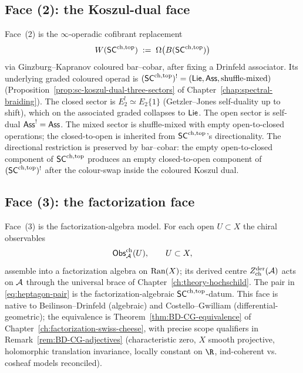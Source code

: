 \subsection{Face (2): the Koszul-dual face}\label{subsec:face-koszul-dual}

Face~(2) is the $\infty$-operadic cofibrant replacement
\begin{equation}
 W(\mathsf{SC}^{\mathrm{ch},\mathrm{top}})
 \;:=\;
 \Omega\bigl(B(\mathsf{SC}^{\mathrm{ch},\mathrm{top}})\bigr)
\end{equation}
via Ginzburg--Kapranov coloured bar--cobar, after fixing a Drinfeld
associator. Its underlying graded coloured operad is
$(\mathsf{SC}^{\mathrm{ch},\mathrm{top}})^{!}=(\mathsf{Lie},\mathsf{Ass},\text{shuffle-mixed})$
(Proposition~\ref{prop:sc-koszul-dual-three-sectors} of
Chapter~\ref{chap:spectral-braiding}).
The closed sector is
$E_2^{!}\simeq E_2\{1\}$ (Getzler--Jones self-duality up to shift),
which on the associated graded collapses to $\mathsf{Lie}$.
The open sector is self-dual $\mathsf{Ass}^{!}=\mathsf{Ass}$. The mixed sector is
shuffle-mixed with empty open-to-closed operations; the
closed-to-open is inherited from $\mathsf{SC}^{\mathrm{ch},\mathrm{top}}$'s directionality.
The directional restriction is preserved by bar--cobar: the empty
open-to-closed component of $\mathsf{SC}^{\mathrm{ch},\mathrm{top}}$ produces an empty
closed-to-open component of $(\mathsf{SC}^{\mathrm{ch},\mathrm{top}})^!$ after the colour-swap
inside the coloured Koszul dual.

\subsection{Face (3): the factorization face}\label{subsec:face-factorization}

Face~(3) is the factorization-algebra model. For each open $U\subset X$
the chiral observables
\begin{equation}
 \mathsf{Obs}^{\mathrm{ch}}_{\mathcal{A}}(U),\qquad U\subset X,
\end{equation}
assemble into a factorization algebra on $\mathrm{Ran}(X)$; its derived
centre $Z^{\mathrm{der}}_{\mathrm{ch}}(\mathcal{A})$ acts on $\mathcal{A}$ through the
universal brace of Chapter~\ref{ch:theory-hochschild}. The pair in
\eqref{eq:heptagon-pair} is the factorization-algebraic
$\mathsf{SC}^{\mathrm{ch},\mathrm{top}}$-datum. This face is native to Beilinson--Drinfeld
(algebraic) and Costello--Gwilliam (differential-geometric); the
equivalence is Theorem~\ref{thm:BD-CG-equivalence} of
Chapter~\ref{ch:factorization-swiss-cheese}, with precise scope
qualifiers in Remark~\ref{rem:BD-CG-adjectives} (characteristic zero,
$X$ smooth projective, holomorphic translation invariance,
locally constant on $\R$, ind-coherent vs. cosheaf models reconciled).

